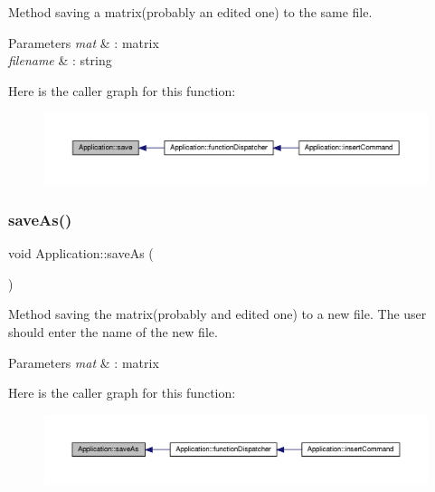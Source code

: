 Method saving a matrix(probably an edited one) to the same file. 
\begin{DoxyParams}{Parameters}
{\em mat} & \+: matrix \\
\hline
{\em filename} & \+: string \\
\hline
\end{DoxyParams}
Here is the caller graph for this function\+:
\nopagebreak
\begin{figure}[H]
\begin{center}
\leavevmode
\includegraphics[width=350pt]{class_application_a2cbf94e01d55a814de35f90f4d874647_icgraph}
\end{center}
\end{figure}
\mbox{\label{class_application_a10d5a48c95593cee25c1b9e0e257b5a7}} 
\subsubsection{\texorpdfstring{save\+As()}{saveAs()}}
{\footnotesize\ttfamily void Application\+::save\+As (\begin{DoxyParamCaption}{ }\end{DoxyParamCaption})\hspace{0.3cm}{\ttfamily [private]}}

Method saving the matrix(probably and edited one) to a new file. The user should enter the name of the new file. 
\begin{DoxyParams}{Parameters}
{\em mat} & \+: matrix \\
\hline
\end{DoxyParams}
Here is the caller graph for this function\+:
\nopagebreak
\begin{figure}[H]
\begin{center}
\leavevmode
\includegraphics[width=350pt]{class_application_a10d5a48c95593cee25c1b9e0e257b5a7_icgraph}
\end{center}
\end{figure}
\mbox{\label{class_application_a76de879568ee39ac80484441716928d2}} 
